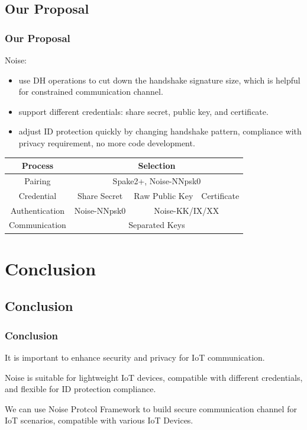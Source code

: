 \documentclass{ctexbeamer}
\begin{document}
\subsection{Our Proposal}
\begin{frame}
    \frametitle{Our Proposal}

    Noise: 
    \begin{itemize}
\item use DH operations to cut down the handshake signature size, which is helpful for constrained communication channel.
\item support different credentials: share secret, public key, and certificate.
\item adjust ID protection quickly by changing handshake pattern, compliance with privacy requirement, no more code development.
    \end{itemize}


    \begin{table}[width=\textwidth]
        \begin{tabular}{ |c|c|c|c| } \hline
            \textbf{Process} & \multicolumn{3}{|c|}{\textbf{Selection}}  \\ \hline
            Pairing & \multicolumn{3}{|c|}{Spake2+, Noise-NNpsk0} \\ \hline
            Credential & Share Secret & Raw Public Key & Certificate \\ \hline
            Authentication & Noise-NNpsk0 & \multicolumn{2}{|c|}{Noise-KK/IX/XX} \\ \hline
            Communication &  \multicolumn{3}{|c|}{Separated Keys} \\ \hline
        \end{tabular}
    \end{table}

\end{frame}

\section{Conclusion}

\subsection{Conclusion}

\begin{frame}
    \frametitle{Conclusion}
It is important to enhance security and privacy for IoT communication. \newline

Noise is suitable for lightweight IoT devices, compatible with different credentials, and flexible for ID protection compliance. \newline

We can use Noise Protcol Framework to build secure communication channel for IoT scenarios, compatible with various IoT Devices. \newline


    \end{frame}
\end{document}

